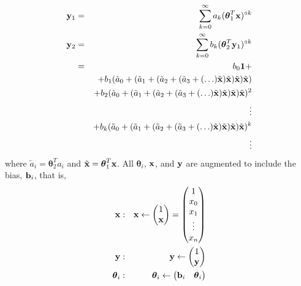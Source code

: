 \begin{eqnarray}
	{\bold y}_1 & = & \sum_{k=0}^\infty a_k (\boldsymbol\theta_1^T {\bold x})\he{k} \nonumber \\
	{\bold y}_2 & = & \sum_{k=0}^\infty b_k (\boldsymbol\theta_2^T {\bold y}_1)\he{k} \nonumber \\
		& = & b_0 {\bold 1} + \nonumber\\
		&   & + b_1 (\tilde a_0 +%
					(\tilde a_1 + %
						(\tilde a_2 + %
							(\tilde a_3 + %
								(\ldots) \tilde {\bold x} )%
							\tilde {\bold x} )%
						\tilde {\bold x} )%
					\tilde {\bold x}) \nonumber \\
		&   & + b_2 (\tilde a_0 +%
					(\tilde a_1 + %
						(\tilde a_2 + %
							(\tilde a_3 + %
								(\ldots) \tilde {\bold x} )%
							\tilde {\bold x} )%
						\tilde {\bold x} )%
					\tilde {\bold x})^2 \nonumber \\
		&   & \vdots \nonumber \\
		&   & + b_k (\tilde a_0 +%
					(\tilde a_1 + %
						(\tilde a_2 + %
							(\tilde a_3 + %
								(\ldots) \tilde {\bold x} )%
							\tilde {\bold x} )%
						\tilde {\bold x} )%
					\tilde {\bold x})^k \nonumber \\
		&   & \vdots
\end{eqnarray}
\noindent where $\tilde a_i = \boldsymbol\theta_2^T a_i$ and $\tilde{\bold x} = \boldsymbol\theta_1^T {\bold x}$. All $\boldsymbol\theta_i$, ${\bold x}$, and ${\bold y}$ are augmented to include the bias, ${\bold b}_i$, that is,
\begin{eqnarray}
	{\bold x}&:& {\bold x} \leftarrow \begin{pmatrix}
								1 \\
								{\bold x}
							\end{pmatrix} = \begin{pmatrix}
											1 \\
											x_0 \\
											x_1 \\
											\vdots \\
											x_n
										\end{pmatrix}\\
	{\bold y}&:& {\bold y} \leftarrow \begin{pmatrix}
								1 \\
								{\bold y}
							\end{pmatrix} \\
	\boldsymbol\theta_i&:& \boldsymbol\theta_i \leftarrow \begin{pmatrix} {\bold b}_i & \boldsymbol\theta_i \end{pmatrix}
\end{eqnarray}

